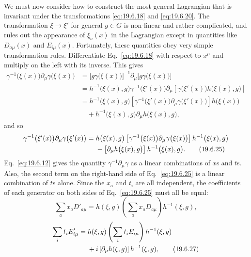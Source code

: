 We must now consider how to construct the most general Lagrangian that is invariant under the transformations \eqref{eq:19.6.18} and \eqref{eq:19.6.20}. The transformation $\xi\to\xi'$ for general $g\in G$ is non-linear and rather complicated, and rules out the appearance of $\xi_a(x)$ in the Lagrangian except in quantities like $D_{a\mu}(x)$ and $E_{i\mu}(x)$. Fortunately, these quantities obey very simple transformation rules. Differentiate Eq.~\eqref{eq:19.6.18} with respect to $x^\mu$ and multiply on the left with its inverse. This gives
\[
\begin{aligned}
\gamma^{-1}\bigl(\xi(x)\bigr)\partial_\mu\gamma\bigl(\xi(x)\bigr)
&=\bigl[g\gamma\bigl(\xi(x)\bigr)\bigr]^{-1}
\partial_\mu\bigl[g\gamma\bigl(\xi(x)\bigr)\bigr]
\\
&=h^{-1}\bigl(\xi(x),g\bigr)
\gamma^{-1}\bigl(\xi'(x)\bigr)
\partial_\mu\left[
\gamma\bigl(\xi'(x)\bigr)h\bigl(\xi(x),g\bigr)\right]
\\
&=h^{-1}\bigl(\xi(x),g\bigr)
\left[
\gamma^{-1}\bigl(\xi'(x)\bigr)
\partial_\mu\gamma\bigl(\xi'(x)\bigr)\right]
h\bigl(\xi(x)\bigr)
\\
&\quad
+h^{-1}\bigl(\xi(x),g\bigr)
\partial_\mu h\bigl(\xi(x),g\bigr),
\end{aligned}
\]
and so
\begin{align}
\gamma^{-1}\bigl(\xi'(x)\bigr)
\partial_\mu\gamma\bigl(\xi'(x)\bigr)
={}&h\bigl(\xi(x),g\bigr)
\left[
\gamma^{-1}\bigl(\xi(x)\bigr)
\partial_\mu\gamma\bigl(\xi(x)\bigr)\right]
h^{-1}\bigl(\xi(x),g\bigr)
\notag\\
&-\left[
\partial_\mu h\bigl(\xi(x),g\bigr)\right]
h^{-1}\bigl(\xi(x),g\bigr).
\tag{19.6.25}\label{eq:19.6.25}
\end{align}
Eq.~\eqref{eq:19.6.12} gives the quantity $\gamma^{-1}\partial_\mu\gamma$ as a linear combinations of $x$s and $t$s. Also, the second term on the right-hand side of Eq.~\eqref{eq:19.6.25} is a linear combination of $t$s alone. Since the $x_a$ and $t_i$ are all independent, the coefficients of each generator on both sides of Eq.~\eqref{eq:19.6.25} must all be equal:
\begin{equation}
\sum_a x_aD'_{a\mu}
=h(\xi,g)\left(\sum_a x_aD_{a\mu}\right)h^{-1}(\xi,g),
\tag{19.6.26}\label{eq:19.6.26}
\end{equation}
\begin{align}
\sum_i t_iE'_{i\mu}
={}&h(\xi,g)\left(\sum_i t_iE_{i\mu}\right)h^{-1}(\xi,g)
\notag\\
&+i\left[\partial_\mu h(\xi,g)\right]h^{-1}(\xi,g),
\tag{19.6.27}\label{eq:19.6.27}
\end{align}
